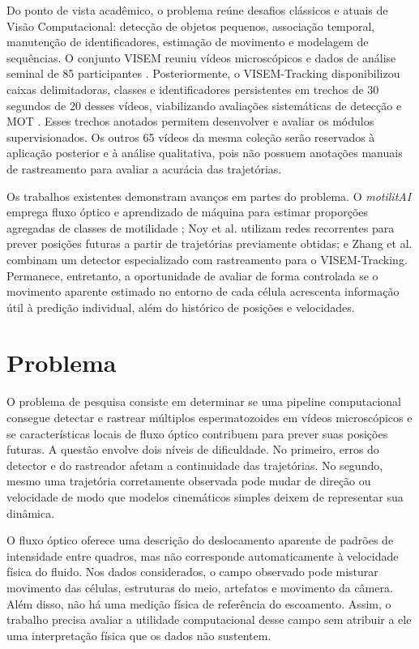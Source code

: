 Do ponto de vista acadêmico, o problema reúne desafios clássicos e atuais de Visão Computacional: detecção de objetos pequenos, associação temporal, manutenção de identificadores, estimação de movimento e modelagem de sequências. O conjunto VISEM reuniu vídeos microscópicos e dados de análise seminal de 85 participantes \cite{haugen2019visem}. Posteriormente, o VISEM-Tracking disponibilizou caixas delimitadoras, classes e identificadores persistentes em trechos de 30 segundos de 20 desses vídeos, viabilizando avaliações sistemáticas de detecção e \ac{MOT} \cite{thambawita2023visemtracking}. Esses trechos anotados permitem desenvolver e avaliar os módulos supervisionados. Os outros 65 vídeos da mesma coleção serão reservados à aplicação posterior e à análise qualitativa, pois não possuem anotações manuais de rastreamento para avaliar a acurácia das trajetórias.

Os trabalhos existentes demonstram avanços em partes do problema. O \textit{motilitAI} emprega fluxo óptico e aprendizado de máquina para estimar proporções agregadas de classes de motilidade \cite{ottl2022motilitai}; Noy et al. \cite{noy2023location} utilizam redes recorrentes para prever posições futuras a partir de trajetórias previamente obtidas; e Zhang et al. \cite{zhang2024spermyolo} combinam um detector especializado com rastreamento para o VISEM-Tracking. Permanece, entretanto, a oportunidade de avaliar de forma controlada se o movimento aparente estimado no entorno de cada célula acrescenta informação útil à predição individual, além do histórico de posições e velocidades.

\section{Problema}

O problema de pesquisa consiste em determinar se uma pipeline computacional consegue detectar e rastrear múltiplos espermatozoides em vídeos microscópicos e se características locais de fluxo óptico contribuem para prever suas posições futuras. A questão envolve dois níveis de dificuldade. No primeiro, erros do detector e do rastreador afetam a continuidade das trajetórias. No segundo, mesmo uma trajetória corretamente observada pode mudar de direção ou velocidade de modo que modelos cinemáticos simples deixem de representar sua dinâmica.

O fluxo óptico oferece uma descrição do deslocamento aparente de padrões de intensidade entre quadros, mas não corresponde automaticamente à velocidade física do fluido. Nos dados considerados, o campo observado pode misturar movimento das células, estruturas do meio, artefatos e movimento da câmera. Além disso, não há uma medição física de referência do escoamento. Assim, o trabalho precisa avaliar a utilidade computacional desse campo sem atribuir a ele uma interpretação física que os dados não sustentem.

